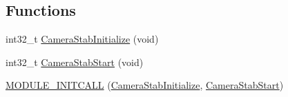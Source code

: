 \subsection*{\-Functions}
\begin{DoxyCompactItemize}
\item 
int32\-\_\-t \hyperlink{group___camera_stab_ga8bb94b51a3ec12f84fe0597c845ddd12}{\-Camera\-Stab\-Initialize} (void)
\item 
int32\-\_\-t \hyperlink{group___camera_stab_ga4869e8ea0ca41440b337709ea1e12709}{\-Camera\-Stab\-Start} (void)
\item 
\hyperlink{group___camera_stab_gac1275942f14da04844aa1ca1c0aac737}{\-M\-O\-D\-U\-L\-E\-\_\-\-I\-N\-I\-T\-C\-A\-L\-L} (\hyperlink{group___camera_stab_ga8bb94b51a3ec12f84fe0597c845ddd12}{\-Camera\-Stab\-Initialize}, \hyperlink{group___camera_stab_ga4869e8ea0ca41440b337709ea1e12709}{\-Camera\-Stab\-Start})
\end{DoxyCompactItemize}


